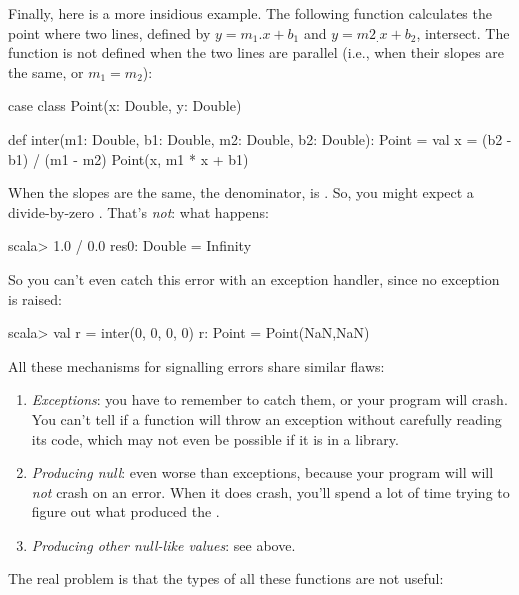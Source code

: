 \documentclass{book}
\begin{document}
Finally, here is a more insidious example. The following function calculates the
point where two lines, defined by $y = m_1.x + b_1$ and $y = m2_.x + b_2$, intersect.
The function is not defined when the two lines are parallel (i.e., when their
slopes are the same, or $m_1 = m_2$):

\begin{scalacode}
 case class Point(x: Double, y: Double)

 def inter(m1: Double, b1: Double, m2: Double, b2: Double): Point = {
   val x = (b2 - b1) / (m1 - m2)
   Point(x, m1 * x + b1)
 }
\end{scalacode}

When the slopes are the same, the denominator,  is
. So, you
might expect a divide-by-zero . That's \emph{not}:
what happens:

\begin{console}
scala> 1.0 / 0.0
res0: Double = Infinity
\end{console}

So you can't even catch this error with an exception handler, since no exception
is raised:

\begin{console}
scala> val r = inter(0, 0, 0, 0)
r: Point = Point(NaN,NaN)
\end{console}

All these mechanisms for signalling errors share similar flaws:
%
\begin{enumerate}

  \item \emph{Exceptions}: you have to remember to catch them, or your program will
   crash. You can't tell if a function will throw an exception without carefully
   reading its code, which may not even be possible if it is in a library.

  \item  \emph{Producing null}: even worse than exceptions, because your program
   will will \emph{not} crash on an error. When it does crash, you'll spend a
   lot of time trying to figure out what produced the .

   \item \emph{Producing other null-like values}: see above.

 \end{enumerate}

The real problem is that the types of all these functions are not useful:
\end{document}
